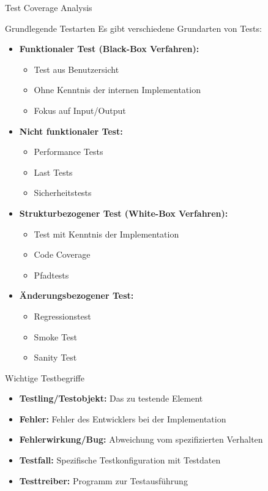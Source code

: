 \begin{example2}{Test Coverage Analysis}
\begin{concept}{Grundlegende Testarten}
Es gibt verschiedene Grundarten von Tests:
\begin{itemize}
    \item \textbf{Funktionaler Test (Black-Box Verfahren):} 
    \begin{itemize}
        \item Test aus Benutzersicht
        \item Ohne Kenntnis der internen Implementation
        \item Fokus auf Input/Output
    \end{itemize}
    \item \textbf{Nicht funktionaler Test:}
    \begin{itemize}
        \item Performance Tests
        \item Last Tests
        \item Sicherheitstests
    \end{itemize}
    \item \textbf{Strukturbezogener Test (White-Box Verfahren):}
    \begin{itemize}
        \item Test mit Kenntnis der Implementation
        \item Code Coverage 
        \item Pfadtests
    \end{itemize}
    \item \textbf{Änderungsbezogener Test:}
    \begin{itemize}
        \item Regressionstest
        \item Smoke Test
        \item Sanity Test
    \end{itemize}
\end{itemize}
\end{concept}

\begin{definition}{Wichtige Testbegriffe}
\begin{itemize}
    \item \textbf{Testling/Testobjekt:} Das zu testende Element
    \item \textbf{Fehler:} Fehler des Entwicklers bei der Implementation
    \item \textbf{Fehlerwirkung/Bug:} Abweichung vom spezifizierten Verhalten
    \item \textbf{Testfall:} Spezifische Testkonfiguration mit Testdaten
    \item \textbf{Testtreiber:} Programm zur Testausführung
\end{itemize}
\end{definition}


\end{example2}
